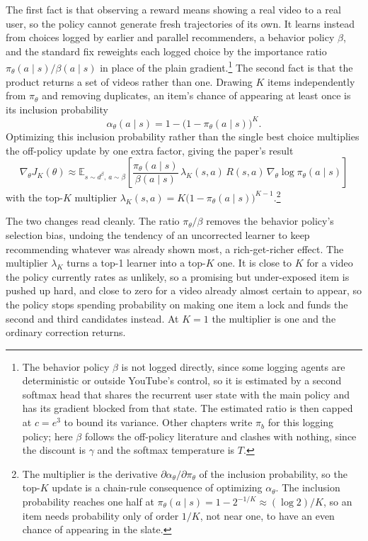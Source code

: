 The first fact is that observing a reward means showing a real video to a real user, so the policy cannot generate fresh trajectories of its own. It learns instead from choices logged by earlier and parallel recommenders, a behavior policy $\beta$, and the standard fix reweights each logged choice by the importance ratio $\pi_\theta(a \mid s) / \beta(a \mid s)$ in place of the plain gradient.\footnote{The behavior policy $\beta$ is not logged directly, since some logging agents are deterministic or outside YouTube's control, so it is estimated by a second softmax head that shares the recurrent user state with the main policy and has its gradient blocked from that state. The estimated ratio is then capped at $c = e^3$ to bound its variance. Other chapters write $\pi_b$ for this logging policy; here $\beta$ follows the off-policy literature and clashes with nothing, since the discount is $\gamma$ and the softmax temperature is $T$.} The second fact is that the product returns a set of videos rather than one. Drawing $K$ items independently from $\pi_\theta$ and removing duplicates, an item's chance of appearing at least once is its inclusion probability
\begin{equation}
\label{eq:yt_alpha}
\alpha_\theta(a \mid s) = 1 - \big(1 - \pi_\theta(a \mid s)\big)^K .
\end{equation}
Optimizing this inclusion probability rather than the single best choice multiplies the off-policy update by one extra factor, giving the paper's result
\begin{equation}
\label{eq:yt_topk}
\boxed{\nabla_\theta J_K(\theta) \approx \mathbb{E}_{s \sim d^\beta,\, a \sim \beta}\!\left[ \frac{\pi_\theta(a \mid s)}{\beta(a \mid s)}\, \lambda_K(s,a)\, R(s,a)\, \nabla_\theta \log \pi_\theta(a \mid s) \right]}
\end{equation}
with the top-$K$ multiplier $\lambda_K(s,a) = K\big(1 - \pi_\theta(a \mid s)\big)^{K-1}$.\footnote{The multiplier is the derivative $\partial \alpha_\theta / \partial \pi_\theta$ of the inclusion probability, so the top-$K$ update is a chain-rule consequence of optimizing $\alpha_\theta$. The inclusion probability reaches one half at $\pi_\theta(a \mid s) = 1 - 2^{-1/K} \approx (\log 2)/K$, so an item needs probability only of order $1/K$, not near one, to have an even chance of appearing in the slate.}

The two changes read cleanly. The ratio $\pi_\theta / \beta$ removes the behavior policy's selection bias, undoing the tendency of an uncorrected learner to keep recommending whatever was already shown most, a rich-get-richer effect. The multiplier $\lambda_K$ turns a top-1 learner into a top-$K$ one. It is close to $K$ for a video the policy currently rates as unlikely, so a promising but under-exposed item is pushed up hard, and close to zero for a video already almost certain to appear, so the policy stops spending probability on making one item a lock and funds the second and third candidates instead. At $K = 1$ the multiplier is one and the ordinary correction returns.

